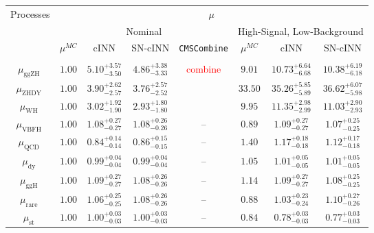 \begin{table}[h!]
	\centering
	\begin{tabular}{cccccccc}
		\multirow{3}{*}{Processes} & \multicolumn{7}{c}{$\mu$}\\
		&\multicolumn{4}{c}{Nominal}&\multicolumn{3}{c}{High-Signal, Low-Background} \\
		& $\mu^{MC}$ & cINN & SN-cINN & \texttt{CMSCombine} & $\mu^{MC}$ & cINN & SN-cINN \\[0.1em]
		 \hline\\
		$\mu_\text{ggZH } $ & $1.00$ & $5.10^{+3.57}_{-3.50}$ & $4.86^{+3.38}_{-3.33}$ &  \textcolor{red}{combine} & $9.01 $ & $10.73^{+6.64}_{-6.68}$ & $10.38^{+6.19}_{-6.18}$ \\[0.3em]
		$\mu_\text{ZHDY } $ & $1.00$ & $3.90^{+2.62}_{-2.57}$ & $3.76^{+2.57}_{-2.52}$ &                           & $33.50$ & $35.26^{+5.85}_{-5.89}$ & $36.62^{+6.07}_{-5.98}$ \\[0.3em]
		$\mu_\text{WH   } $ & $1.00$ & $3.02^{+1.92}_{-1.90}$ & $2.93^{+1.80}_{-1.80}$ &                           & $9.95 $ & $11.35^{+2.98}_{-2.99}$ & $11.03^{+2.90}_{-2.93}$ \\[0.3em]
		$\mu_\text{VBFH } $ & $1.00$ & $1.08^{+0.27}_{-0.27}$ & $1.08^{+0.26}_{-0.26}$ & --                        & $0.89 $ & $1.09^{+0.27}_{-0.27}$  & $1.07^{+0.25}_{-0.25}$  \\[0.3em]
		$\mu_\text{QCD  } $ & $1.00$ & $0.84^{+0.14}_{-0.14}$ & $0.86^{+0.15}_{-0.15}$ & --                        & $1.40 $ & $1.17^{+0.18}_{-0.18}$  & $1.12^{+0.17}_{-0.18}$  \\[0.3em]
		$\mu_\text{dy   } $ & $1.00$ & $0.99^{+0.04}_{-0.04}$ & $0.99^{+0.04}_{-0.04}$ & --                        & $1.05 $ & $1.01^{+0.05}_{-0.05}$  & $1.01^{+0.05}_{-0.05}$  \\[0.3em]
		$\mu_\text{ggH  } $ & $1.00$ & $1.09^{+0.27}_{-0.27}$ & $1.08^{+0.26}_{-0.26}$ & --                        & $1.14 $ & $1.09^{+0.27}_{-0.27}$  & $1.08^{+0.25}_{-0.25}$  \\[0.3em]
		$\mu_\text{rare } $ & $1.00$ & $1.06^{+0.25}_{-0.25}$ & $1.08^{+0.26}_{-0.26}$ & --                        & $0.88 $ & $1.03^{+0.23}_{-0.24}$  & $1.10^{+0.27}_{-0.26}$  \\[0.3em]
		$\mu_\text{st   } $ & $1.00$ & $1.00^{+0.03}_{-0.03}$ & $1.00^{+0.03}_{-0.03}$ & --                        & $0.84 $ & $0.78^{+0.03}_{-0.03}$  & $0.77^{+0.03}_{-0.03}$  \\[0.3em]

\end{tabular}
\end{table}
